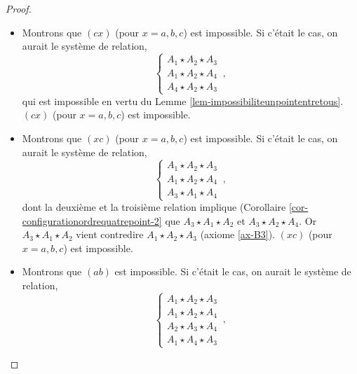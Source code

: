 \begin{cor}
\begin{proof}
        \begin{itemize}[$\bullet$]
            \item Montrons que $(cx)$ (pour $x=a,b,c$) est impossible. Si c'était le cas, on aurait le système de relation,
            \begin{equation*}
                \left\{\begin{array}{cc}
                     A_1 \star A_2 \star A_3  \\
                     A_1 \star A_2 \star A_4  \\
                     A_4 \star A_2 \star A_3
                \end{array}\right.\,,
            \end{equation*}
            qui est impossible en vertu du Lemme \ref{lem-impossibiliteunpointentretous}. $(cx)$ (pour $x=a,b,c$) est impossible.
            \item Montrons que $(xc)$ (pour $x=a,b,c$) est impossible. Si c'était le cas, on aurait le système de relation,
            \begin{equation*}
                \left\{\begin{array}{cc}
                     A_1 \star A_2 \star A_3  \\
                     A_1 \star A_2 \star A_4  \\
                     A_3 \star A_1 \star A_4
                \end{array}\right.\,,
            \end{equation*}
            dont la deuxième et la troisième relation implique (Corollaire \ref{cor-configurationordrequatrepoint-2} que $A_3 \star A_1 \star A_2$ et $A_3 \star A_2 \star A_4$. Or $A_3 \star A_1 \star A_2$ vient contredire $A_1 \star A_2 \star A_3$ (axiome \ref{ax-B3}). $(xc)$ (pour $x=a,b,c$)  est impossible.
            \item Montrons que $(ab)$ est impossible. Si c'était le cas, on aurait le système de relation,
            \begin{equation*}
                \left\{\begin{array}{cc}
                     A_1 \star A_2 \star A_3  \\
                     A_1 \star A_2 \star A_4  \\
                     A_2 \star A_3 \star A_4 \\
                     A_1 \star A_4 \star A_3
                \end{array}\right.\,,
            \end{equation*}

\end{itemize}
\end{proof}
\end{cor}
